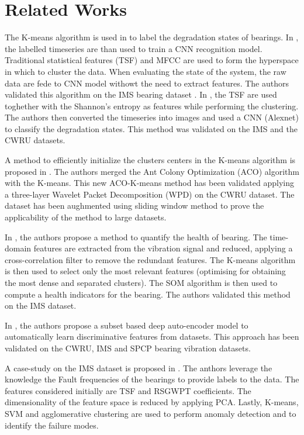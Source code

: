 \section{Related Works}
\label{sec:related_work}


The K-means algorithm is used in \cite{Zhou2019,Pinedo2020} to label the degradation states of bearings.  In \cite{Zhou2019}, the labelled timeseries are than used to train a CNN recognition model. Traditional statistical features (TSF) and MFCC are used to form the hyperspace in which to cluster the data. When evaluating the state of the system, the raw data are fede to CNN model withowt the need to extract features. The authors validated this algorithm on the IMS bearing dataset \cite{IMS_data}. In \cite{Pinedo2020}, the TSF are used toghether with the Shannon's entropy as features while performing the clustering. The authors then converted the timeseries into images and used a CNN (Alexnet) to classify the degradation states. This method was validated on the IMS and the CWRU \cite{CWRU_data} datasets.

A method to efficiently initialize the clusters centers in the K-means algorithm is proposed in \cite{Wan21}. The authors merged the Ant Colony Optimization (ACO) algorithm with the K-means. This new ACO-K-means method has been validated applying a three-layer Wavelet Packet Decomposition (WPD) on the CWRU dataset. The dataset has been aughmented using  sliding window method to prove the applicability of the method to large datasets.

In \cite{Chalouli2017}, the authors propose a method to quantify the health of bearing. The time-domain features are extracted from the vibration signal and reduced, applying a cross-correlation filter to remove the redundant features. The K-means algorithm is then used to select only the most relevant features (optimising for obtaining the most dense and separated clusters). The SOM algorithm is then used to compute a health indicators for the bearing. The authors validated this method on the IMS dataset.

In \cite{ZHANG2018}, the authors propose a subset based deep auto-encoder model to automatically learn discriminative features from datasets. This approach has been validated on the CWRU, IMS and SPCP bearing vibration datasets.

A case-study on the IMS dataset is proposed in \cite{Gattino2023}. The anthors leverage the knowledge the Fault frequencies of the bearings to provide labels to the data. The features considered initially are TSF and RSGWPT coefficients. The dimensionality of the feature space is reduced by applying PCA. Lastly, K-means, SVM and agglomerative clustering are used to perform anomaly detection and to identify the failure modes.

